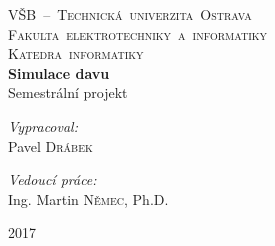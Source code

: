 
\begin{titlepage}
\begin{center}
\textsc{
	\LARGE 
	\mbox{VŠB – Technická univerzita Ostrava}\\
	\mbox{Fakulta elektrotechniky a informatiky}\\
	\mbox{Katedra informatiky}
}\\[3.5cm]
{ \huge \bfseries Simulace davu}\\[1.4cm]
\Large Semestrální projekt\\[0.5cm]
\begin{minipage}{0.4\textwidth}
\begin{flushleft} \large
\emph{Vypracoval:}\\
Pavel \textsc{Drábek}
\end{flushleft}
\end{minipage}
\begin{minipage}{0.5\textwidth}
\begin{flushright} \large
\emph{Vedoucí práce:} \\
Ing. Martin \textsc{Němec}, Ph.D.
\end{flushright}
\end{minipage}
\vfill
{\large 2017}
\end{center}
\end{titlepage}

